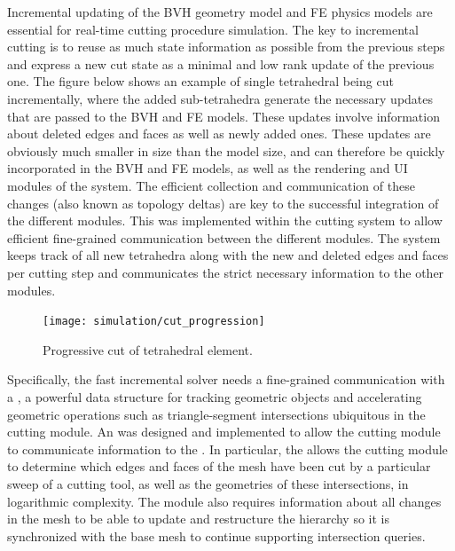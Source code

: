 
Incremental updating of the BVH geometry model and FE physics models are essential for real-time cutting procedure simulation. The key to incremental cutting is to reuse as much state information as possible from the previous steps and express a new cut state as a minimal and low rank update of the previous one. The figure below shows an example of single tetrahedral being cut incrementally, where the added sub-tetrahedra generate the necessary updates that are passed to the BVH and FE models. These updates involve information about deleted edges and faces as well as newly added ones. These updates are obviously much smaller in size than the model size, and can therefore be quickly incorporated in the BVH and FE models, as well as the rendering and UI modules of the system. The efficient collection and communication of these changes (also known as topology deltas) are key to the successful integration of the different modules. This was implemented within the cutting system to allow efficient fine-grained communication between the different modules. The system keeps track of all new tetrahedra along with the new and deleted edges and faces per cutting step and communicates the strict necessary information to the other modules.



\begin{figure}
  \centering%
  \texttt{[image: simulation/cut\_progression]}
  \caption{Progressive cut of tetrahedral element.}\label{fig:discontinuous_tetrahedra_solver}
\end{figure}

Specifically, the fast incremental solver needs a fine-grained communication with a , a powerful data structure for tracking geometric objects and accelerating geometric operations such as triangle-segment intersections ubiquitous in the cutting module. An  was designed and implemented to allow the cutting module to communicate information to the . In particular, the   allows the cutting module to determine which edges and faces of the mesh have been cut by a particular sweep of a cutting tool, as well as the geometries of these intersections, in logarithmic complexity. The  module also requires information about all changes in the mesh to be able to update and restructure the hierarchy so it is synchronized with the base mesh to continue supporting intersection queries. 


